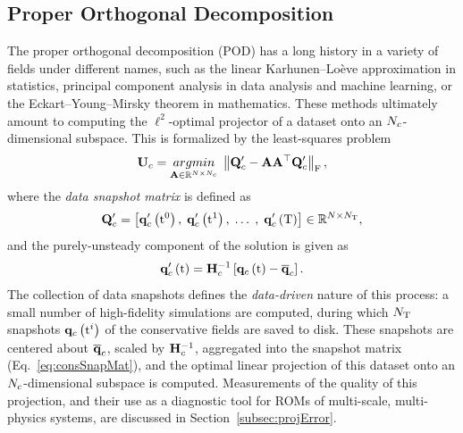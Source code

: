 \subsection{Proper Orthogonal Decomposition}\label{subsec:POD}
%
The proper orthogonal decomposition (POD) has a long history in a variety of fields under different names, such as the linear Karhunen--Loève approximation in statistics, principal component analysis in data analysis and machine learning, or the Eckart--Young--Mirsky theorem in mathematics. These methods ultimately amount to computing the $\ell^2$-optimal projector of a dataset onto an $N_c$-dimensional subspace. This is formalized by the least-squares problem
%
\begin{equation}\label{eq:podLS}
    \consTrial = \argmin{\dummyMatOne \inRTwo{\numDOF}{\numConsModes}} \norm{ \consDataMatUns - \dummyMatOne \dummyMatOne^\top \consDataMatUns }_\text{F},
\end{equation}
%
where the \textit{data snapshot matrix} is defined as
%
\begin{equation}\label{eq:consSnapMat}
	\consDataMatUns = \left[ \consFuncUns{\initTime}, \; \consFuncUns{\timeVar^1}, \; \hdots \; , \; \consFuncUns{\finalTime} \right] \in \RTwo{\numDOF}{\numSnaps},
\end{equation}
%
and the purely-unsteady component of the solution is given as
%
\begin{equation}\label{eq:consUns}
	\consFuncUns{\timeVar} = \consScaleInv \left[\consFunc{\timeVar} - \consVecCent\right].
\end{equation}
%
The collection of data snapshots defines the \textit{data-driven} nature of this process: a small number of high-fidelity simulations are computed, during which $N_{\text{T}}$ snapshots $\mathbf{q}_{c} \left(\text{t}^{i}\right)$ of the conservative fields are saved to disk. These snapshots are centered about $\mathbf{\overline{q}}_{c}$, scaled by $\consScaleInv$, aggregated into the snapshot matrix (Eq.~\ref{eq:consSnapMat}), and the optimal linear projection of this dataset onto an $N_c$-dimensional subspace is computed. Measurements of the quality of this projection, and their use as a diagnostic tool for ROMs of multi-scale, multi-physics systems, are discussed in Section~\ref{subsec:projError}.

